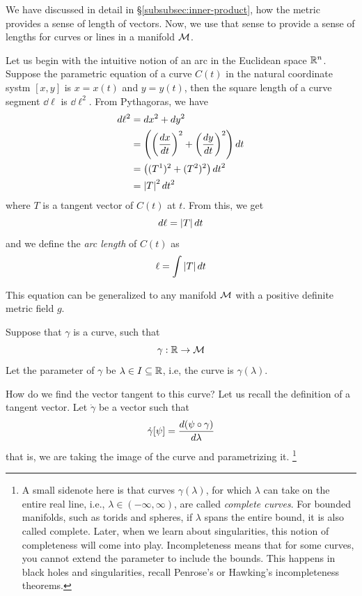 	We have discussed in detail in \S\ref{subsubsec:inner-product},
	how the metric provides a sense of length of vectors.
	Now, we use that sense to provide a sense of lengths for 
	curves or lines in a manifold $\mathcal M$.

	Let us begin with the intuitive notion of an arc in the Euclidean space $\mathbb{R}^n$.
	Suppose the parametric equation of a curve $C(t)$ in  the natural coordinate systm
	$[x,y]$ is $x= x(t)$ and $y = y(t)$, then the square length 
	of a curve segment $\dd{\ell}$ is $\dd{\ell}^2$. From Pythagoras,
	we have
	\begin{align*}
		d\ell^2 &= dx^2 + dy^2 \\
				&= \pqty{
					\pqty{
						\dv{x}{t} 
					}^2
					+
					\pqty{
						\dv{y}{t} 
					}^2
				}
				\dd{t}\\
				&=
				\pqty{
					(T^1)^2 
					+
					(T^2)^2
				}\dd{t}^2\\
				&=
				\abs{T}^2\dd{t}^2
	\end{align*}
	where $T$ is a tangent vector of $C(t)$ at $t$. From this, we get
	\[
		\dd{\ell} = \abs{T}\dd{t}
	\]
	and we define the \textit{arc length} of $C(t)$ as
	\[
		\ell = \int \abs{T}\dd{t}
	\]

	This equation can be generalized to any manifold $\mathcal M$ with 
	a positive definite metric field $g$. 

	Suppose that $\gamma$ is a curve, such that
	\[
		\gamma:\mathbb{R}\to \mathcal M
	\]
	Let the parameter of $\gamma$ be $\lambda\in I\subseteq\mathbb{R}$, i.e,
	the curve is $\gamma(\lambda)$.

	How do we find the vector tangent to this curve? Let us recall
	the definition of a tangent vector. Let $\dot\gamma$ be a vector such that
	\begin{equation}
		\label{eq:gamma-tanvec}
		\dot \gamma [\psi] = \dv{(\psi\circ\gamma)}{\lambda} 
	\end{equation}
	that is, we are taking the image of the curve and parametrizing it.%
	\footnote{
		A small sidenote here is that curves $\gamma(\lambda)$, for which
		$\lambda$ can take on the entire real line, i.e., $\lambda\in(-\infty,\infty)$,
		are called \textit{complete curves}. For bounded manifolds, such as torids and spheres,
		if $\lambda$ spans the entire bound, it is also called complete. Later, when we learn about singularities,
		this notion of completeness will come into play. Incompleteness means that for some curves, you cannot 
		extend the parameter to include the bounds. This happens in black holes and singularities, recall Penrose's or Hawking's incompleteness theorems.
	}
	
